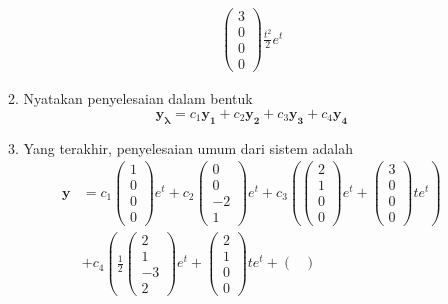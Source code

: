 \documentclass[a4paper]{article}
\theoremstyle{definisi}
\numberwithin{equation}{section}
\begin{document}
\begin{enumerate}
\begin{enumerate}[label=Langkah \arabic*: ,leftmargin=*]
\begin{align*}
\begin{pmatrix}
          3\\0\\0\\0
        \end{pmatrix}\frac{t^2}{2}e^{t}
      \end{align*}
      \item Nyatakan penyelesaian dalam bentuk
      \begin{equation*}
        \mathbf{y_{\lambda}}=c_1\mathbf{y_1}+c_2\mathbf{y_2}+c_3\mathbf{y_3}+c_4\mathbf{y_4}
      \end{equation*}
      \item Yang terakhir, penyelesaian umum dari sistem adalah
      \begin{equation*}
        \begin{split}
          \mathbf{y}&=c_1\begin{pmatrix}
            1\\0\\0\\0
          \end{pmatrix}e^{t}+c_2\begin{pmatrix}
            0\\0\\-2\\1
          \end{pmatrix}e^{t}+c_3\left(\begin{pmatrix}
            2\\1\\0\\0
          \end{pmatrix}e^{t}+\begin{pmatrix}
            3\\0\\0\\0
          \end{pmatrix}te^{t}\right)\\
          &+c_4\left(\frac{1}{2}\begin{pmatrix}
            2\\1\\-3\\2
          \end{pmatrix}e^{t}+\begin{pmatrix}
            2\\1\\0\\0
          \end{pmatrix}te^{t}+\begin{pmatrix}

\end{pmatrix}
\end{split}
\end{equation*}
\end{enumerate}
\end{enumerate}
\end{document}
